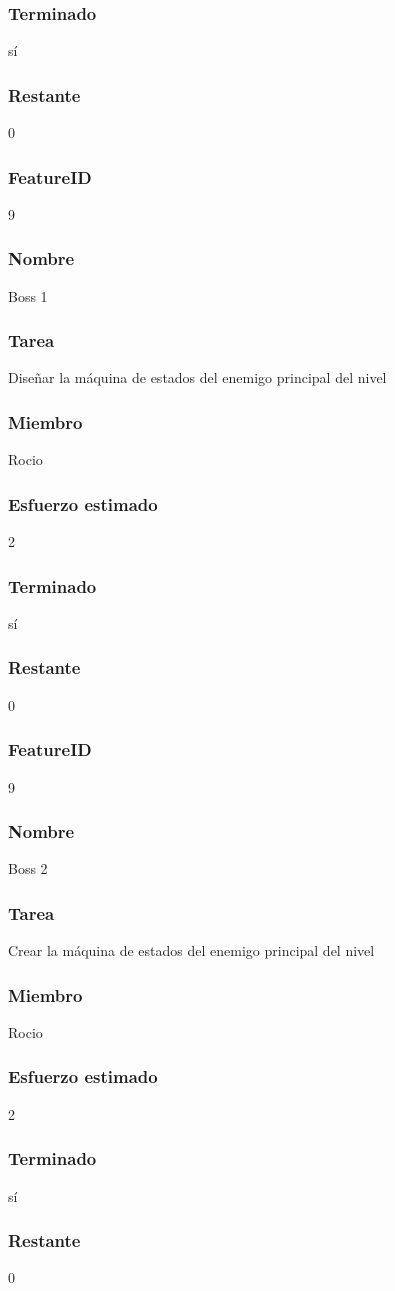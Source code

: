 \subsubsection{Terminado} sí
\subsubsection{Restante} 0

\subsubsection{FeatureID} 9
\subsubsection{Nombre} Boss 1
\subsubsection{Tarea} Diseñar la máquina de estados del enemigo principal del nivel
\subsubsection{Miembro} Rocio
\subsubsection{Esfuerzo estimado} 2
\subsubsection{Terminado} sí
\subsubsection{Restante} 0

\subsubsection{FeatureID} 9
\subsubsection{Nombre} Boss 2
\subsubsection{Tarea} Crear la máquina de estados del enemigo principal del nivel
\subsubsection{Miembro} Rocio
\subsubsection{Esfuerzo estimado} 2
\subsubsection{Terminado} sí
\subsubsection{Restante} 0
